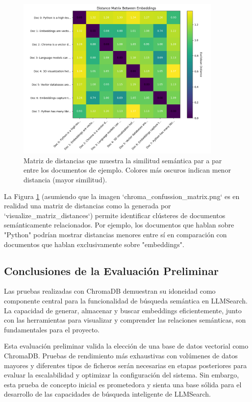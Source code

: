 \begin{figure}[H]
\centering
\includegraphics[width=0.9\textwidth]{archivos/chroma_confussion_matrix.png}
\caption[Matriz de Distancias Semánticas entre Documentos con ChromaDB]{Matriz de distancias que muestra la similitud semántica par a par entre los documentos de ejemplo. Colores más oscuros indican menor distancia (mayor similitud).}
\label{fig:chroma_dist_matrix_eval}
\end{figure}

La Figura \ref{fig:chroma_dist_matrix_eval} (asumiendo que la imagen `chroma\_confussion\_matrix.png` es en realidad una matriz de distancias como la generada por `visualize\_matriz\_distances`) permite identificar clústeres de documentos semánticamente relacionados. Por ejemplo, los documentos que hablan sobre "Python" podrían mostrar distancias menores entre sí en comparación con documentos que hablan exclusivamente sobre "embeddings".

\subsection{Conclusiones de la Evaluación Preliminar}
Las pruebas realizadas con ChromaDB demuestran su idoneidad como componente central para la funcionalidad de búsqueda semántica en LLMSearch. La capacidad de generar, almacenar y buscar embeddings eficientemente, junto con las herramientas para visualizar y comprender las relaciones semánticas, son fundamentales para el proyecto.

Esta evaluación preliminar valida la elección de una base de datos vectorial como ChromaDB. Pruebas de rendimiento más exhaustivas con volúmenes de datos mayores y diferentes tipos de ficheros serán necesarias en etapas posteriores para evaluar la escalabilidad y optimizar la configuración del sistema. Sin embargo, esta prueba de concepto inicial es prometedora y sienta una base sólida para el desarrollo de las capacidades de búsqueda inteligente de LLMSearch.


